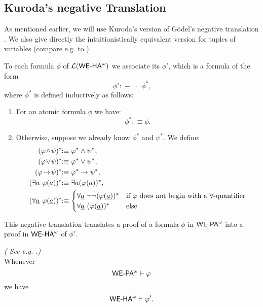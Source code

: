 \subsection{Kuroda's negative Translation}
%
As mentioned earlier, we will use Kuroda's version \cite{Kuroda51} of G\"odel's
negative translation \cite{Goedel33}. We also give directly the intuitionistically
equivalent version for tuples of variables 
(compare e.g. to \cite{Kohlenbach08}).
\begin{dfn}[Kuroda '51] \label{d:NT}
To each formula $\phi$ of ${\mathcal L}({\textsf{\upshape WE-HA}}^{\omega})$ we associate its 
$\phi'$, which is a formula of the form
\[
\phi':\equiv \neg\neg \phi^*
\text{,}
\]
where $\phi^*$ is defined inductively as follows:
\begin{enumerate}
\item For an atomic formula $\phi$ we have:
\[
\phi^*:\equiv\phi\text{.}
\]
\item Otherwise, suppose we already know $\phi^*$ 
and $\psi^*$. We define:
\begin{align*}
(\phi\!\wedge\!\psi)^*\!\!&:\equiv
    \phi^* \wedge \psi^*\text{,}\\
(\phi\!\vee\!\psi)^*\!\!&:\equiv
    \phi^* \vee \psi^*\text{,}\\
(\phi\!\rightarrow\!\psi)^*\!\!&:\equiv
    \phi^* \rightarrow \psi^*\text{,}\\
(\exists a\ \phi(a))^*\!\!&:\equiv
  \exists a (\phi(a))^*\text{,}\\
(\forall \tup a\ \phi(\tup a))^*\!\!&:\equiv
  \begin{cases}
    \forall \tup a\ \neg\neg (\phi(\tup a))^* & \text{if $\phi$ does not begin with a $\forall$-quantifier}\\
    \forall \tup a\ (\phi(\tup a))^* & \text{else}
  \end{cases}
\end{align*}
\end{enumerate}
\end{dfn}
%
This negative translation translates a proof of 
a formula $\phi$ in ${\textsf{\upshape WE-PA}}^{\omega}$ into a proof in
${\textsf{\upshape WE-HA}}^{\omega}$ of $\phi'$.
\begin{thm}{\em( See e.g. \cite{Luckhardt73}.)\\}
Whenever
\[
{\textsf{\upshape WE-PA}}^{\omega} \vdash \varphi
\]
we have 
\[
{\textsf{\upshape WE-HA}}^{\omega} \vdash \varphi'\text{.}
\]
\end{thm}
%
